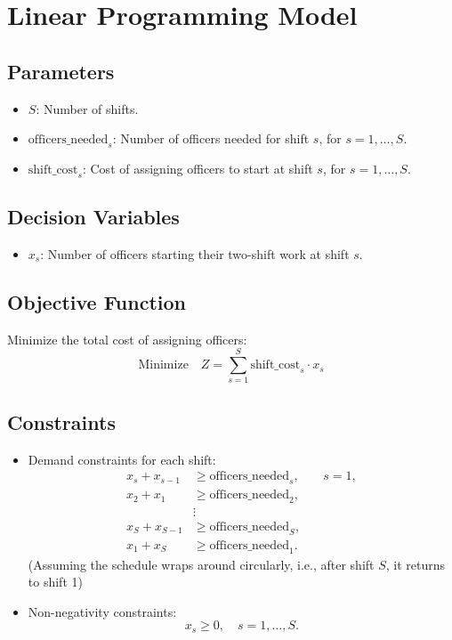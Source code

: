 \documentclass{article}
\begin{document}
\section*{Linear Programming Model}

\subsection*{Parameters}
\begin{itemize}
    \item \( S \): Number of shifts.
    \item \( \text{officers\_needed}_s \): Number of officers needed for shift \( s \), for \( s = 1, \ldots, S \).
    \item \( \text{shift\_cost}_s \): Cost of assigning officers to start at shift \( s \), for \( s = 1, \ldots, S \).
\end{itemize}

\subsection*{Decision Variables}
\begin{itemize}
    \item \( x_s \): Number of officers starting their two-shift work at shift \( s \).
\end{itemize}

\subsection*{Objective Function}
Minimize the total cost of assigning officers:
\[
\text{Minimize} \quad Z = \sum_{s=1}^{S} \text{shift\_cost}_s \cdot x_s
\]

\subsection*{Constraints}
\begin{itemize}
    \item Demand constraints for each shift:
    \[
    \begin{aligned}
        x_s + x_{s-1} & \geq \text{officers\_needed}_s, & \quad s = 1, \\
        x_2 + x_1 & \geq \text{officers\_needed}_2, \\
        & \vdots \\
        x_S + x_{S-1} & \geq \text{officers\_needed}_S, \\
        x_1 + x_S & \geq \text{officers\_needed}_1. 
    \end{aligned}
    \]
    (Assuming the schedule wraps around circularly, i.e., after shift \( S \), it returns to shift 1)
    
    \item Non-negativity constraints:
    \[
    x_s \geq 0, \quad s = 1, \ldots, S.
    \]
\end{itemize}
\end{document}
